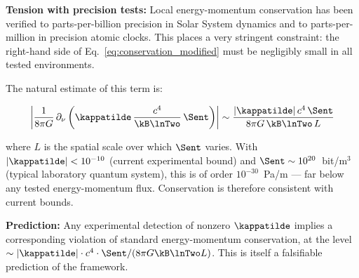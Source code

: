 \textbf{Tension with precision tests:} Local energy-momentum conservation
has been verified to parts-per-billion precision in Solar System dynamics
and to parts-per-million in precision atomic clocks. This places a very
stringent constraint: the right-hand side of Eq.~\eqref{eq:conservation_modified}
must be negligibly small in all tested environments.

The natural estimate of this term is:

\begin{equation}
    \left|\frac{1}{8\pi G}\,\partial_\nu\left(\kappatilde\,
    \frac{c^4}{\kB\lnTwo}\,\Sent\right)\right|
    \sim \frac{|\kappatilde|\,c^4\,\Sent}{8\pi G\,\kB\lnTwo\,L}
\end{equation}

\noindent where $L$ is the spatial scale over which $\Sent$ varies.
With $|\kappatilde| < 10^{-10}$ (current experimental bound) and
$\Sent \sim 10^{20}$~bit/m$^3$ (typical laboratory quantum system),
this is of order $10^{-30}$~Pa/m --- far below any tested energy-momentum
flux. Conservation is therefore consistent with current bounds.

\textbf{Prediction:} Any experimental detection of nonzero $\kappatilde$
implies a corresponding violation of standard energy-momentum conservation,
at the level $\sim |\kappatilde|\cdot c^4 \cdot\Sent / (8\pi G\kB\lnTwo L)$.
This is itself a falsifiable prediction of the framework.
